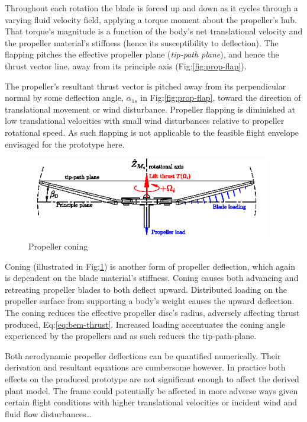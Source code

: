 Throughout each rotation the blade is forced up and down as it cycles through a varying fluid velocity field, applying a torque moment about the propeller's hub. That torque's magnitude is a function of the body's net translational velocity and the propeller material's stiffness (hence its susceptibility to deflection). The flapping pitches the effective propeller plane (\emph{tip-path plane}), and hence the thrust vector line, away from its principle axis (Fig:\ref{fig:prop-flap}).
\par
The propeller's resultant thrust vector is pitched away from its perpendicular normal by some deflection angle, $\alpha_{1s}$ in Fig:\ref{fig:prop-flap}, toward the direction of translational movement or wind disturbance. Propeller flapping is diminished at low translational velocities with small wind disturbances relative to propeller rotational speed. As such flapping is not applicable to the feasible flight envelope envisaged for the prototype here.
\par
\begin{figure}[hbtp]
\centering
\includegraphics[width=0.95\textwidth]{figs/prop-coning}
\caption{Propeller coning}
\label{fig:prop-coning}
\end{figure}
Coning (illustrated in Fig:\ref{fig:prop-coning}) is another form of propeller deflection, which again is dependent on the blade material's stiffness. Coning causes both advancing and retreating propeller blades to both deflect upward. Distributed loading on the propeller surface from supporting a body's weight causes the upward deflection. The coning reduces the effective propeller disc's radius, adversely affecting thrust produced, Eq:\ref{eq:bem-thrust}. Increased loading accentuates the coning angle experienced by the propellers and as such reduces the tip-path-plane.
\par
Both aerodynamic propeller deflections can be quantified numerically. Their derivation and resultant equations are cumbersome however. In practice both effects on the produced prototype are not significant enough to affect the derived plant model. The frame could potentially be affected in more adverse ways given certain flight conditions with higher translational velocities or incident wind and fluid flow disturbances\ldots
